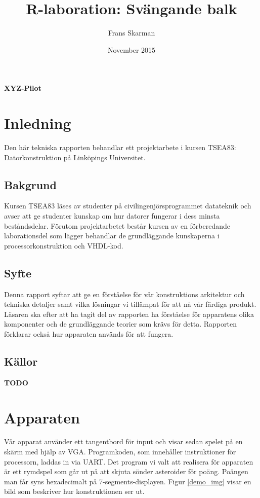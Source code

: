 \documentclass[a4paper]{article}
\title{R-laboration: Svängande balk}
\author{Frans Skarman}
\date{November 2015}
\begin{document}
    \begin{titlepage}

        

    	\vspace{2cm}
        \centering
    	{\huge\bfseries XYZ-Pilot\par}
    	\vfill
    
    	\vfill
    \end{titlepage}
    
    \section{Inledning}
    Den här tekniska rapporten behandlar ett projektarbete i kursen TSEA83:
    Datorkonstruktion på Linköpings Universitet.





    \subsection{Bakgrund}
    Kursen TSEA83 läses av studenter på civilingenjörsprogrammet datateknik och
    avser att ge studenter kunskap om hur datorer fungerar i dess minsta
    beståndsdelar. Förutom projektarbetet består kursen av en förberedande
    laborationsdel som lägger behandlar de grundläggande kunskaperna i
    processorkonstruktion och VHDL-kod. 
    


    \subsection{Syfte}
    Denna rapport syftar att ge en förståelse för vår konstruktions arkitektur
    och tekniska detaljer samt vilka lösningar vi tillämpat för att nå vår
    färdiga produkt. Läsaren ska efter att ha tagit del av rapporten ha
    förståelse för apparatens olika komponenter och de grundläggande teorier som
    krävs för detta. Rapporten förklarar också hur apparaten används för att
    fungera.


    \subsection{Källor}
    \textbf{TODO}

    
    \newpage
        
    \section{Apparaten}
    Vår apparat använder ett tangentbord för input och visar sedan spelet på en
    skärm med hjälp av VGA. Programkoden, som innehåller instruktioner för
    processorn, laddas in via UART. Det program vi valt att realisera för apparaten
    är ett rymdspel som går ut på att skjuta sönder asteroider för poäng. Poängen
    man får syns hexadecimalt på 7-segments-displayen. Figur \ref{demo_img} visar en bild som
    beskriver hur konstruktionen ser ut.
\end{document}
